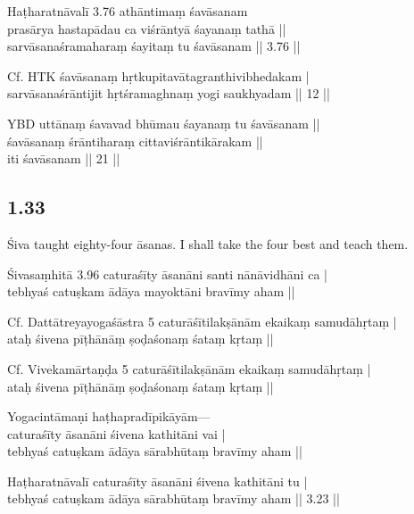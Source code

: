 \begin{ekdosis}
\begin{testimonia}[hp01_032]
Haṭharatnāvalī 3.76
\startverse
athāntimaṃ śavāsanam\\
prasārya hastapādau ca viśrāntyā śayanaṃ tathā ||\\
sarvāsanaśramaharaṃ śayitaṃ tu śavāsanam || 3.76 ||
\endverse

Cf. HTK
\startverse
śavāsanaṃ hṛtkupitavātagranthivibhedakam |\\
sarvāsanaśrāntijit hṛtśramaghnaṃ yogi saukhyadam || 12 ||
\endverse

YBD
\startverse
uttānaṃ śavavad bhūmau śayanaṃ tu śavāsanam ||\\
śavāsanaṃ śrāntiharaṃ cittaviśrāntikārakam ||\\
iti śavāsanam || 21 ||
\endverse
\end{testimonia}

\subsection*{1.33}
\begin{translation}[hp01_033]
Śiva taught eighty-four āsanas. I shall take the four best and teach them.
\end{translation}

\begin{sources}[hp01_033]
Śivasaṃhitā 3.96
\startverse
caturaśīty āsanāni santi nānāvidhāni ca |\\
tebhyaś catuṣkam ādāya mayoktāni bravīmy aham ||
\endverse

Cf. Dattātreyayogaśāstra 5
\startverse
caturāśītilakṣānām ekaikaṃ samudāhṛtaṃ |\\
ataḥ śivena pīṭhānāṃ ṣoḍaśonaṃ śataṃ kṛtaṃ ||
\endverse

Cf. Vivekamārtaṇḍa 5
\startverse
caturāśītilakṣānām ekaikaṃ samudāhṛtaṃ |\\
ataḥ śivena pīṭhānāṃ ṣoḍaśonaṃ śataṃ kṛtaṃ ||
\endverse
\end{sources}

\begin{testimonia}[hp01_033]
Yogacintāmaṇi
\startverse
haṭhapradīpikāyām—\\
caturaśīty āsanāni śivena kathitāni vai |\\
tebhyaś catuṣkam ādāya sārabhūtaṃ bravīmy aham ||
\endverse

Haṭharatnāvalī
\startverse
caturaśīty āsanāni śivena kathitāni tu |\\
tebhyaś catuṣkam ādāya sārabhūtaṃ bravīmy aham || 3.23 ||
\endverse
\end{testimonia}


\end{ekdosis}
